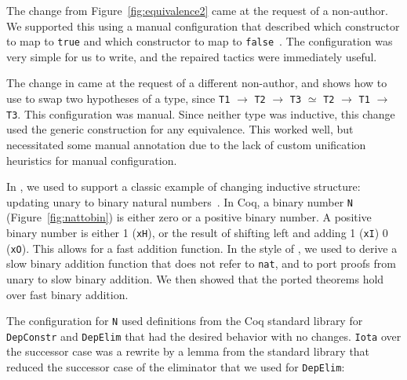 The change from Figure~\ref{fig:equivalence2} came at the request of a non-author.
We supported this using a manual configuration that described which constructor to map to \lstinline{true}
and which constructor to map to \lstinline{false}~.
The configuration was very simple for us to write, and the repaired tactics were immediately useful.

The change in  came at the request of a different non-author, and shows how to 
use \toolname to swap two hypotheses of a type, since \lstinline{T1} $\rightarrow$ \lstinline{T2} $\rightarrow$ \lstinline{T3} $\simeq$
\lstinline{T2} $\rightarrow$ \lstinline{T1} $\rightarrow$ \lstinline{T3}.
This configuration was manual.
Since neither type was inductive, this change used the generic construction for any equivalence.
This worked well, but necessitated some manual annotation due to the lack of custom unification heuristics for 
manual configuration.

In , we used \toolname to support a classic example of changing inductive structure:
updating unary to binary natural numbers~\cite{magaud2000changing}.
In Coq, a binary number \lstinline{N} (Figure~\ref{fig:nattobin}) is either zero or a positive binary number. A positive binary number
is either 1 (\lstinline{xH}), or the result of shifting left and adding 1 (\lstinline{xI})
0 (\lstinline{xO}).
This allows for a fast addition function. %
In the style of \citet{magaud2000changing}, we used \toolname to derive a slow binary
addition function that does not refer to \lstinline{nat},
and to port proofs from unary to slow binary addition.
We then showed that the ported theorems hold over fast binary addition.

The configuration for \lstinline{N} used definitions from the Coq standard library
for \lstinline{DepConstr} and \lstinline{DepElim} that had the desired behavior with no changes.
\lstinline{Iota} over the successor case was a rewrite by a lemma
from the standard library that reduced the successor case of the eliminator that we used for \lstinline{DepElim}:

